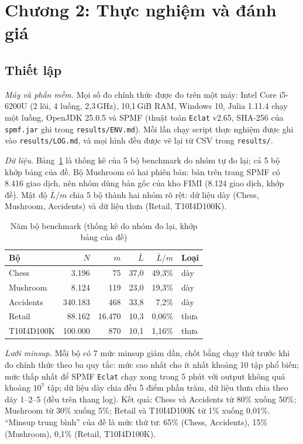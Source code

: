 \section{Chương 2: Thực nghiệm và đánh giá}
\label{sec:thuc-nghiem}

\subsection{Thiết lập}
\label{sec:thiet-lap}

\emph{Máy và phần mềm.} Mọi số đo chính thức được đo trên một máy: Intel Core i5-6200U (2 lõi, 4 luồng, 2,3\,GHz), 10,1\,GiB RAM, Windows 10, Julia 1.11.4 chạy một luồng, OpenJDK 25.0.5 và SPMF (thuật toán \texttt{Eclat} v2.65, SHA-256 của \texttt{spmf.jar} ghi trong \texttt{results/ENV.md}). Mỗi lần chạy script thực nghiệm được ghi vào \texttt{results/LOG.md}, và mọi hình đều được vẽ lại từ CSV trong \texttt{results/}.

\emph{Dữ liệu.} Bảng~\ref{tab:b06} là thống kê của 5 bộ benchmark do nhóm tự đo lại; cả 5 bộ khớp bảng của đề. Bộ Mushroom có hai phiên bản: bản trên trang SPMF có 8.416 giao dịch, nên nhóm dùng bản gốc của kho FIMI (8.124 giao dịch, khớp đề). Mật độ $\bar{L}/m$ chia 5 bộ thành hai nhóm rõ rệt: dữ liệu dày (Chess, Mushroom, Accidents) và dữ liệu thưa (Retail, T10I4D100K).

\begin{table}[t]
\caption{Năm bộ benchmark (thống kê do nhóm đo lại, khớp bảng của đề)}
\label{tab:b06}
\centering
\footnotesize
\setlength{\tabcolsep}{3.2pt}
\begin{tabular}{@{}lrrrrl@{}}
\toprule
Bộ & $N$ & $m$ & $\bar{L}$ & $\bar{L}/m$ & Loại \\
\midrule
Chess & 3.196 & 75 & 37,0 & 49,3\% & dày \\
Mushroom & 8.124 & 119 & 23,0 & 19,3\% & dày \\
Accidents & 340.183 & 468 & 33,8 & 7,2\% & dày \\
Retail & 88.162 & 16.470 & 10,3 & 0,06\% & thưa \\
T10I4D100K & 100.000 & 870 & 10,1 & 1,16\% & thưa \\
\bottomrule
\end{tabular}
\end{table}

\emph{Lưới minsup.} Mỗi bộ có 7 mức minsup giảm dần, chốt bằng chạy thử trước khi đo chính thức theo ba quy tắc: mức cao nhất cho ít nhất khoảng 10 tập phổ biến; mức thấp nhất để SPMF \texttt{Eclat} chạy xong trong 5 phút với output không quá khoảng $10^7$ tập; dữ liệu dày chia đều 5 điểm phần trăm, dữ liệu thưa chia theo dãy 1--2--5 (đều trên thang log). Kết quả: Chess và Accidents từ 80\% xuống 50\%; Mushroom từ 30\% xuống 5\%; Retail và T10I4D100K từ 1\% xuống 0,01\%. ``Minsup trung bình'' của đề là mức thứ tư: 65\% (Chess, Accidents), 15\% (Mushroom), 0,1\% (Retail, T10I4D100K).

